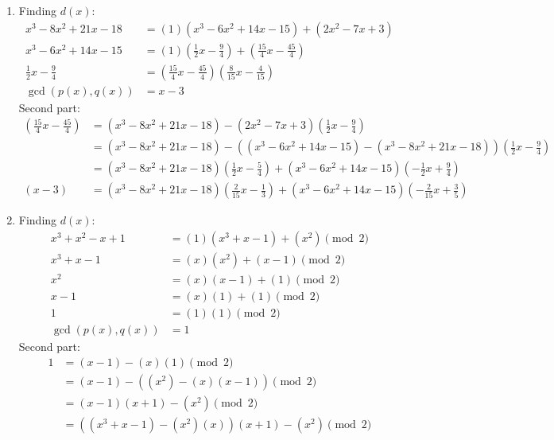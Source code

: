 \documentclass[12pt]{report}
\begin{document}
\begin{enumerate}[label=\alph*.]
    \item Finding $d(x)$:\begin{align*}
        x^3 - 8x^2 + 21x - 18 &= (1)( x^3 - 6x^2 + 14x - 15) + (2x^2 - 7x + 3) \\
        x^3 - 6x^2 + 14x - 15 &= (1)\left(\frac{1}{2}x - \frac{9}{4}\right) + \left(\frac{15}{4}x - \frac{45}{4}\right)\\
        \frac{1}{2}x - \frac{9}{4} &= \left(\frac{15}{4}x - \frac{45}{4}\right)\left(\frac{8}{15}x - \frac{4}{15}\right) \\
        \operatorname{gcd}(p(x), q(x)) &= x - 3
    \end{align*} 
    Second part:
    \begin{align*}
        \left(\frac{15}{4}x - \frac{45}{4}\right) &= (x^3 - 8x^2 + 21x - 18) - (2x^2 - 7x + 3)\left(\frac{1}{2}x - \frac{9}{4}\right) \\
        &=  (x^3 - 8x^2 + 21x - 18) - ((x^3 - 6x^2 + 14x - 15) - (x^3 - 8x^2 + 21x - 18))\left(\frac{1}{2}x - \frac{9}{4}\right) \\
        &= (x^3 - 8x^2 + 21x - 18)\left(\frac{1}{2}x - \frac{5}{4}\right) + (x^3 - 6x^2 + 14x - 15)\left(-\frac{1}{2}x + \frac{9}{4}\right) \\
        (x-3) &= (x^3 - 8x^2 + 21x - 18)\left(\frac{2}{15}x - \frac{1}{3}\right) + (x^3 - 6x^2 + 14x - 15)\left(-\frac{2}{15}x + \frac{3}{5}\right) 
    \end{align*}
    \item Finding $d(x)$:\begin{align*}
        x^3 + x^2 -x + 1 &= (1)(x^3 + x -1) + (x^2)\pmod{2}\\
        x^3 + x -1 &= (x)(x^2) + (x-1)\pmod{2} \\
        x^2 &= (x)(x-1) + (1) \pmod{2}\\
        x-1 &= (x)(1) + (1)\pmod{2} \\
        1 &= (1)(1) \pmod{2} \\
        \operatorname{gcd}(p(x), q(x)) &= 1
    \end{align*} 
    Second part:
    \begin{align*}
        1 &= (x-1) - (x)(1) \pmod{2} \\
        &= (x-1) - ((x^2) - (x)(x-1))\pmod{2} \\
        &= (x-1)(x+1) - (x^2) \pmod{2} \\
        &= ((x^3+x-1)-(x^2)(x))(x+1) - (x^2) \pmod{2} \\

\end{align*}
\end{enumerate}
\end{document}
